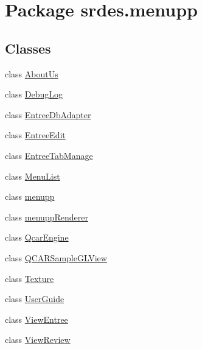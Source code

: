 \hypertarget{namespacesrdes_1_1menupp}{\section{\-Package srdes.\-menupp}
\label{namespacesrdes_1_1menupp}
}
\subsection*{\-Classes}
\begin{DoxyCompactItemize}
\item 
class \hyperlink{classsrdes_1_1menupp_1_1_about_us}{\-About\-Us}
\item 
class \hyperlink{classsrdes_1_1menupp_1_1_debug_log}{\-Debug\-Log}
\item 
class \hyperlink{classsrdes_1_1menupp_1_1_entree_db_adapter}{\-Entree\-Db\-Adapter}
\item 
class \hyperlink{classsrdes_1_1menupp_1_1_entree_edit}{\-Entree\-Edit}
\item 
class \hyperlink{classsrdes_1_1menupp_1_1_entree_tab_manage}{\-Entree\-Tab\-Manage}
\item 
class \hyperlink{classsrdes_1_1menupp_1_1_menu_list}{\-Menu\-List}
\item 
class \hyperlink{classsrdes_1_1menupp_1_1menupp}{menupp}
\item 
class \hyperlink{classsrdes_1_1menupp_1_1menupp_renderer}{menupp\-Renderer}
\item 
class \hyperlink{classsrdes_1_1menupp_1_1_qcar_engine}{\-Qcar\-Engine}
\item 
class \hyperlink{classsrdes_1_1menupp_1_1_q_c_a_r_sample_g_l_view}{\-Q\-C\-A\-R\-Sample\-G\-L\-View}
\item 
class \hyperlink{classsrdes_1_1menupp_1_1_texture}{\-Texture}
\item 
class \hyperlink{classsrdes_1_1menupp_1_1_user_guide}{\-User\-Guide}
\item 
class \hyperlink{classsrdes_1_1menupp_1_1_view_entree}{\-View\-Entree}
\item 
class \hyperlink{classsrdes_1_1menupp_1_1_view_review}{\-View\-Review}
\end{DoxyCompactItemize}
